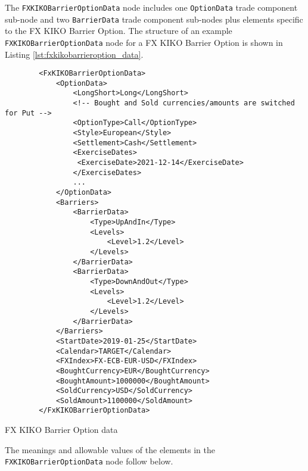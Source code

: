 The \lstinline!FXKIKOBarrierOptionData!  node includes one  \lstinline!OptionData! trade component sub-node and two \lstinline!BarrierData! trade component sub-nodes plus elements
specific to the FX KIKO Barrier Option. The structure of an example \lstinline!FXKIKOBarrierOptionData! node for a FX KIKO Barrier Option is shown in Listing
\ref{lst:fxkikobarrieroption_data}.

\begin{listing}[H]
\begin{verbatim}
        <FxKIKOBarrierOptionData>
            <OptionData>
                <LongShort>Long</LongShort>
                <!-- Bought and Sold currencies/amounts are switched for Put -->
                <OptionType>Call</OptionType>
                <Style>European</Style>
                <Settlement>Cash</Settlement>
                <ExerciseDates>
                 <ExerciseDate>2021-12-14</ExerciseDate>
                </ExerciseDates>                
                ...
            </OptionData>
            <Barriers>
                <BarrierData>
                    <Type>UpAndIn</Type>
                    <Levels>
                        <Level>1.2</Level>
                    </Levels>
                </BarrierData>
                <BarrierData>
                    <Type>DownAndOut</Type>
                    <Levels>
                        <Level>1.2</Level>
                    </Levels>
                </BarrierData>
            </Barriers>
            <StartDate>2019-01-25</StartDate>
            <Calendar>TARGET</Calendar>
            <FXIndex>FX-ECB-EUR-USD</FXIndex>
            <BoughtCurrency>EUR</BoughtCurrency>
            <BoughtAmount>1000000</BoughtAmount>
            <SoldCurrency>USD</SoldCurrency>
            <SoldAmount>1100000</SoldAmount>
        </FxKIKOBarrierOptionData>
\end{verbatim}
\caption{FX KIKO Barrier Option data}
\label{lst:fxkikobarrieroption_data}
\end{listing}

The meanings and allowable values of the elements in the \lstinline!FXKIKOBarrierOptionData!  node follow below.

